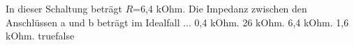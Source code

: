     {In dieser Schaltung beträgt $R$=6,4 kOhm. Die Impedanz zwischen den Anschlüssen a und b beträgt im Idealfall ...}
    {0,4 kOhm.}
    {26 kOhm.}
    {6,4 kOhm.}
    {1,6 kOhm.}
    {true}{false}